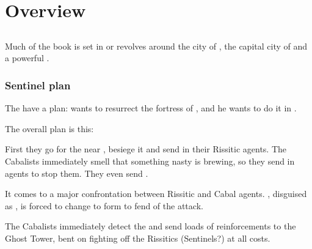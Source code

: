 
















\section{Overview}

\begin{comment}

\end{comment}









\subsection{\Malcur}
Much of the book is set in or revolves around the city of , the capital city of  and a powerful .





\subsubsection{Sentinel plan}
The  have a plan: 
 wants to resurrect the \draconic{} fortress of , and he wants to do it in \Malcur. 

The overall plan is this:

First they go for the  near , besiege it and send in their Rissitic agents. 
The Cabalists immediately smell that something nasty is brewing, so they send in agents to stop them. 
They even send \banes. 

It comes to a major confrontation between Rissitic and Cabal agents. 
, disguised as , is forced to change to \draconic{} form to fend of the \bane{} attack. 

The Cabalists immediately detect the \dragon{} and send loads of reinforcements to the Ghost Tower, bent on fighting off the Rissitics (Sentinels?) at all costs. 

